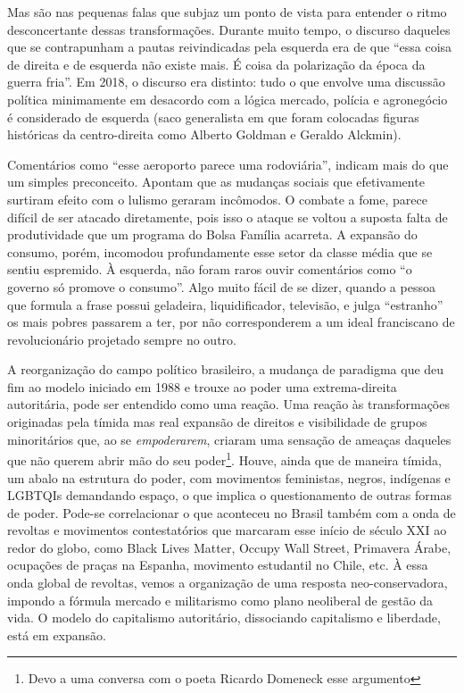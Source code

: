 Mas são nas pequenas falas que subjaz um ponto de vista para entender o
ritmo desconcertante dessas transformações. Durante muito tempo, o
discurso daqueles que se contrapunham a pautas reivindicadas pela
esquerda era de que ``essa coisa de direita e de esquerda não existe
mais. É coisa da polarização da época da guerra fria''. Em 2018, o
discurso era distinto: tudo o que envolve uma discussão política
minimamente em desacordo com a lógica mercado, polícia e agronegócio é
considerado de esquerda (saco generalista em que foram colocadas figuras
históricas da centro-direita como Alberto Goldman e Geraldo Alckmin).

Comentários como ``esse aeroporto parece uma rodoviária'', indicam mais
do que um simples preconceito. Apontam que as mudanças sociais que
efetivamente surtiram efeito com o lulismo geraram incômodos. O combate
a fome, parece difícil de ser atacado diretamente, pois isso o ataque se
voltou a suposta falta de produtividade que um programa do Bolsa Família
acarreta. A expansão do consumo, porém, incomodou profundamente esse
setor da classe média que se sentiu espremido. À esquerda, não foram
raros ouvir comentários como ``o governo só promove o consumo''. Algo
muito fácil de se dizer, quando a pessoa que formula a frase possui
geladeira, liquidificador, televisão, e julga ``estranho'' os mais
pobres passarem a ter, por não corresponderem a um ideal franciscano de
revolucionário projetado sempre no outro.

A reorganização do campo político brasileiro, a mudança de paradigma que
deu fim ao modelo iniciado em 1988 e trouxe ao poder uma extrema-direita
autoritária, pode ser entendido como uma reação. Uma reação às
transformações originadas pela tímida mas real expansão de direitos e
visibilidade de grupos minoritários que, ao se \emph{empoderarem},
criaram uma sensação de ameaças daqueles que não querem abrir mão do seu
poder\footnote{Devo a uma conversa com o poeta Ricardo
  Domeneck esse argumento}. Houve, ainda que de maneira tímida, um
abalo na estrutura do poder, com movimentos feministas, negros,
indígenas e LGBTQIs demandando espaço, o que implica o questionamento de
outras formas de poder. Pode-se correlacionar o que aconteceu no Brasil
também com a onda de revoltas e movimentos contestatórios que marcaram
esse início de século XXI ao redor do globo, como Black Lives Matter,
Occupy Wall Street, Primavera Árabe, ocupações de praças na Espanha,
movimento estudantil no Chile, etc. À essa onda global de revoltas,
vemos a organização de uma resposta neo-conservadora, impondo a fórmula
mercado e militarismo como plano neoliberal de gestão da vida. O modelo
do capitalismo autoritário, dissociando capitalismo e liberdade, está em
expansão.

